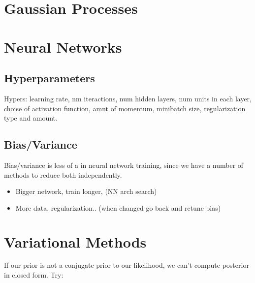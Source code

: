 \documentclass[11pt]{article}
\begin{document}
\section{Gaussian Processes}
\label{sec:gp}



\section{Neural Networks}
\label{sec:nn}

\subsection{Hyperparameters}
Hypers: learning rate, nm iteractions, num hidden layers, num units in
each layer, choise of activation function, amnt of momentum, minibatch size,
regularization type and amount.

\subsection{Bias/Variance}

Bias/variance is less of a  in neural network training, since we
have a number of methods to reduce both independently.
\begin{itemize}
  \item {} Bigger network, train longer, (NN arch
  search)
  \item {} More data, regularization.. (when
  changed go back and retune bias)
\end{itemize}


\section{Variational Methods}
\label{sec:var_meth}

If our prior is not a conjugate prior to our likelihood, we can't compute
posterior in closed form. Try:
\end{document}
